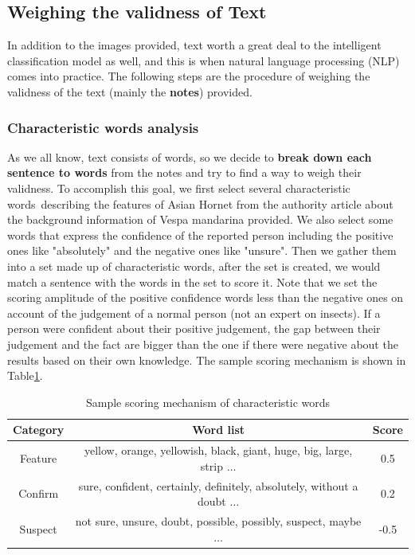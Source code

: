 \documentclass{mcmthesis}
\begin{document}
	\subsection{Weighing the validness of Text}
	\quad In addition to the images provided, text worth a great deal to the intelligent classification model as well, and this is when natural language processing (NLP) comes into practice. The following steps are the procedure of weighing the validness of the text (mainly the \textbf{notes}) provided.
	\subsubsection{Characteristic words analysis}
	\quad As we all know, text consists of words, so we decide to \textbf{break down each sentence to words} from the notes and try to find a way to weigh their validness. To accomplish this goal, we first select several characteristic words describing the features of Asian Hornet from the authority article about the background information of Vespa mandarina provided. We also select some words that express the confidence of the reported person including the positive ones like "absolutely" and the negative ones like "unsure". Then we gather them into a set made up of characteristic words, after the set is created, we would match a sentence with the words in the set to score it. Note that we set the scoring amplitude of the positive confidence words less than the negative ones on account of the judgement of a normal person (not an expert on insects). If a person were confident about their positive judgement, the gap between their judgement and the fact are bigger than the one if there were negative about the results based on their own knowledge. The sample scoring mechanism is shown in Table\ref{words}.
	\begin{table}[h]
		\centering
		\begin{tabular}{ccc}
			\toprule
			Category &Word list &Score \\
			\midrule 
			Feature&yellow, orange, yellowish, black, giant, huge, big, large, strip $\dots$ &0.5\\
			Confirm&sure, confident, certainly, definitely, absolutely, without a doubt $\dots$ &0.2\\
			Suspect&not sure, unsure, doubt, possible, possibly, suspect, maybe  $\dots$ &-0.5\\
			\bottomrule
		\end{tabular}
		\caption{Sample scoring mechanism of characteristic words}
		\label{words}
	\end{table}
\end{document}
